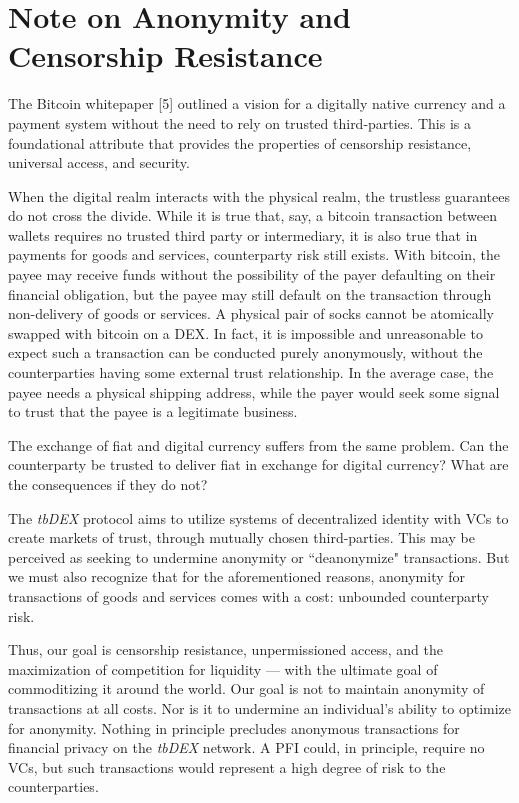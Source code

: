\documentclass[11pt]{article}
\begin{document}
\vspace{1\baselineskip}
\section{Note on Anonymity and Censorship Resistance}

\vspace{1\baselineskip}
The Bitcoin whitepaper [5] outlined a vision for a digitally native currency and a payment system without the need to rely on trusted third-parties. This is a foundational attribute that provides the properties of censorship resistance, universal access, and security. 

\vspace{1\baselineskip}
When the digital realm interacts with the physical realm, the trustless guarantees do not cross the divide. While it is true that, say, a bitcoin transaction between wallets requires no trusted third party or intermediary, it is also true that in payments for goods and services, counterparty risk still exists. With bitcoin, the payee may receive funds without the possibility of the payer defaulting on their financial obligation, but the payee may still default on the transaction through non-delivery of goods or services. A physical pair of socks cannot be atomically swapped with bitcoin on a DEX. In fact, it is impossible and unreasonable to expect such a transaction can be conducted purely anonymously, without the counterparties having some external trust relationship. In the average case, the payee needs a physical shipping address, while the payer would seek some signal to trust that the payee is a legitimate business. 

\vspace{1\baselineskip}
The exchange of fiat and digital currency suffers from the same problem. Can the counterparty be trusted to deliver fiat in exchange for digital currency? What are the consequences if they do not? 

\vspace{1\baselineskip}
The \textit{tbDEX} protocol aims to utilize systems of decentralized identity with VCs to create markets of trust, through mutually chosen third-parties. This may be perceived as seeking to undermine anonymity or ``deanonymize" transactions. But we must also recognize that for the aforementioned reasons, anonymity for transactions of goods and services comes with a cost: unbounded counterparty risk. 

\vspace{1\baselineskip}
Thus, our goal is censorship resistance, unpermissioned access, and the maximization of competition for liquidity \textcolor[HTML]{202124}{— }with the ultimate goal of commoditizing it around the world. Our goal is not to maintain anonymity of transactions at all costs. Nor is it to undermine an individual’s ability to optimize for anonymity. Nothing in principle precludes anonymous transactions for financial privacy on the \textit{tbDEX} network. A PFI could, in principle, require no VCs, but such transactions would represent a high degree of risk to the counterparties. 
\end{document}
